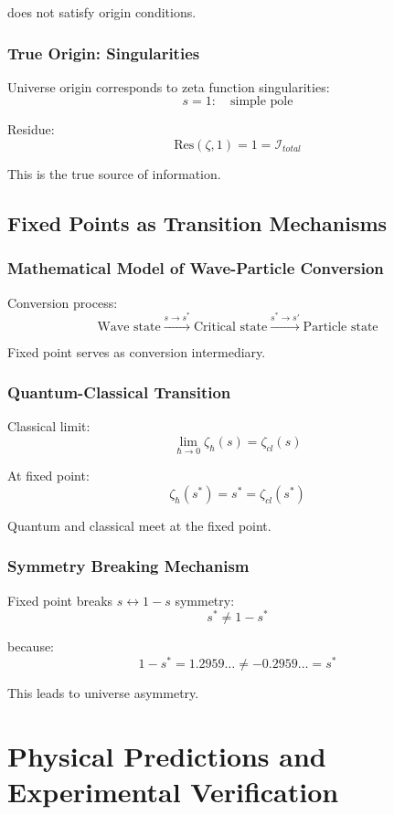 \documentclass[11pt]{article}
\theoremstyle{plain}
\theoremstyle{definition}
\theoremstyle{remark}
\begin{document}
does not satisfy origin conditions.

\subsubsection{True Origin: Singularities}

Universe origin corresponds to zeta function singularities:
$$s = 1: \quad \text{simple pole}$$

Residue:
$$\text{Res}(\zeta, 1) = 1 = \mathcal{I}_{total}$$

This is the true source of information.

\subsection{Fixed Points as Transition Mechanisms}

\subsubsection{Mathematical Model of Wave-Particle Conversion}

Conversion process:
$$\text{Wave state} \xrightarrow{s \to s^*} \text{Critical state} \xrightarrow{s^* \to s'} \text{Particle state}$$

Fixed point serves as conversion intermediary.

\subsubsection{Quantum-Classical Transition}

Classical limit:
$$\lim_{\hbar \to 0} \zeta_{\hbar}(s) = \zeta_{cl}(s)$$

At fixed point:
$$\zeta_{\hbar}(s^*) = s^* = \zeta_{cl}(s^*)$$

Quantum and classical meet at the fixed point.

\subsubsection{Symmetry Breaking Mechanism}

Fixed point breaks $s \leftrightarrow 1-s$ symmetry:
$$s^* \neq 1 - s^*$$

because:
$$1 - s^* = 1.2959\ldots \neq -0.2959\ldots = s^*$$

This leads to universe asymmetry.

\section{Physical Predictions and Experimental Verification}
\end{document}
